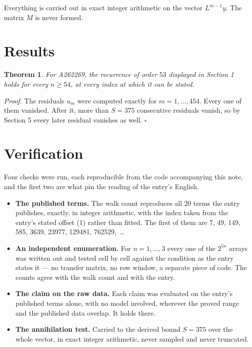 \documentclass[11pt]{article}
\newtheorem{theorem}{Theorem}
\theoremstyle{definition}
\begin{document}
Everything is carried out in exact integer arithmetic on the vector $L^{m-1}y$. The matrix $M$ is never formed.

\section{Results}

\begin{theorem} For A262269, the recurrence of order $53$ displayed in Section 1 holds for every $n \ge 54$, at every index at which it can be stated.\end{theorem}

{\itshape Proof.} The residuals $u_m$ were computed exactly for $m = 1,\dots,454$. Every one of them vanished. After it, more than $S = 375$ consecutive residuals vanish, so by Section 5 every later residual vanishes as well. $\square$

\section{Verification}

Four checks were run, each reproducible from the code accompanying this note, and the first two are what pin the reading of the entry's English.

\begin{itemize}

\item {\bfseries The published terms.} The walk count reproduces all 20 terms the entry publishes, exactly, in integer arithmetic, with the index taken from the entry's stated offset (1) rather than fitted. The first of them are 7, 49, 149, 585, 3639, 23977, 129481, 762529,~\dots

\item {\bfseries An independent enumeration.} For $n = 1,\dots,3$ every one of the $2^{5n}$ arrays was written out and tested cell by cell against the condition as the entry states it --- no transfer matrix, no row window, a separate piece of code. The counts agree with the walk count and with the entry.

\item {\bfseries The claim on the raw data.} Each claim was evaluated on the entry's published terms alone, with no model involved, wherever the proved range and the published data overlap. It holds there.

\item {\bfseries The annihilation test.} Carried to the derived bound $S = 375$ over the whole vector, in exact integer arithmetic, never sampled and never truncated.

\end{itemize}
\end{document}
